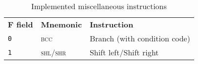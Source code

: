 \begin{table}[h]
    \centering
    \begin{tabular}{|l l l|}
        \hline
        \textbf{F field} & \textbf{Mnemonic} & \textbf{Instruction} \\
        \texttt{0} & \textsc{bcc} & Branch (with condition code) \\
        \texttt{1} & \textsc{shl/shr} & Shift left/Shift right\\
        \hline
    \end{tabular}

    \caption{Implemented miscellaneous instructions}
    \label{tab:misc_instrs}
\end{table}
